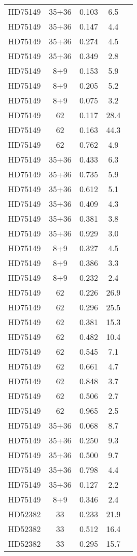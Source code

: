 \begin{table*}
\begin{tabular}{l c c c c}
HD75149 & 35+36 & 0.103 & 6.5\\ 
HD75149 & 35+36 & 0.147 & 4.4\\ 
HD75149 & 35+36 & 0.274 & 4.5\\ 
HD75149 & 35+36 & 0.349 & 2.8\\ 
HD75149 & 8+9 & 0.153 & 5.9\\ 
HD75149 & 8+9 & 0.205 & 5.2\\ 
HD75149 & 8+9 & 0.075 & 3.2\\ 
HD75149 & 62 & 0.117 & 28.4\\ 
HD75149 & 62 & 0.163 & 44.3\\ 
HD75149 & 62 & 0.762 & 4.9\\ 
HD75149 & 35+36 & 0.433 & 6.3\\ 
HD75149 & 35+36 & 0.735 & 5.9\\ 
HD75149 & 35+36 & 0.612 & 5.1\\ 
HD75149 & 35+36 & 0.409 & 4.3\\ 
HD75149 & 35+36 & 0.381 & 3.8\\ 
HD75149 & 35+36 & 0.929 & 3.0\\ 
HD75149 & 8+9 & 0.327 & 4.5\\ 
HD75149 & 8+9 & 0.386 & 3.3\\ 
HD75149 & 8+9 & 0.232 & 2.4\\ 
HD75149 & 62 & 0.226 & 26.9\\ 
HD75149 & 62 & 0.296 & 25.5\\ 
HD75149 & 62 & 0.381 & 15.3\\ 
HD75149 & 62 & 0.482 & 10.4\\ 
HD75149 & 62 & 0.545 & 7.1\\ 
HD75149 & 62 & 0.661 & 4.7\\ 
HD75149 & 62 & 0.848 & 3.7\\ 
HD75149 & 62 & 0.506 & 2.7\\ 
HD75149 & 62 & 0.965 & 2.5\\ 
HD75149 & 35+36 & 0.068 & 8.7\\ 
HD75149 & 35+36 & 0.250 & 9.3\\ 
HD75149 & 35+36 & 0.500 & 9.7\\ 
HD75149 & 35+36 & 0.798 & 4.4\\ 
HD75149 & 35+36 & 0.127 & 2.2\\ 
HD75149 & 8+9 & 0.346 & 2.4\\ 
\hline
HD52382 & 33 & 0.233 & 21.9\\ 
HD52382 & 33 & 0.512 & 16.4\\ 
HD52382 & 33 & 0.295 & 15.7\\ 

\end{tabular}
\end{table*}

